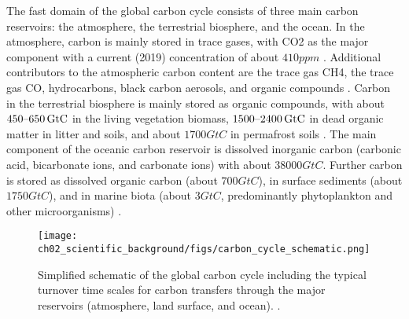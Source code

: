 The fast domain of the global carbon cycle consists of three main carbon
reservoirs: the atmosphere, the terrestrial biosphere, and the ocean. In the
atmosphere, carbon is mainly stored in trace gases, with \ac{CO2} as the major
component with a current (2019) concentration of about $410 \unit{ppm}$
\autocite{Friedlingstein2020}. Additional contributors to the atmospheric
carbon content are the trace gas \ac{CH4}, the trace gas \ac{CO}, hydrocarbons,
black carbon aerosols, and organic compounds \autocite{Ciais2013}. Carbon in
the terrestrial biosphere is mainly stored as organic compounds, with about
$\rangeunit{450}{650}{GtC}$ in the living vegetation biomass,
$\rangeunit{1500}{2400}{GtC}$ in dead organic matter in litter and soils, and
about $1700 \unit{GtC}$ in permafrost soils \autocite{Ciais2013}. The main
component of the oceanic carbon reservoir is dissolved inorganic carbon
(carbonic acid, bicarbonate ions, and carbonate ions) with about $38000
\unit{GtC}$. Further carbon is stored as dissolved organic carbon (about $700
\unit{GtC}$), in surface sediments (about $1750 \unit{GtC}$), and in marine
biota (about $3 \unit{GtC}$, predominantly phytoplankton and other
microorganisms) \autocite{Ciais2013, Friedlingstein2020}.

\begin{figure}[t]
  \centering
  \texttt{[image: 
    ch02\_scientific\_background/figs/carbon\_cycle\_schematic.png]}
  \caption[
    Simplified schematic of the global carbon cycle.
  ]{
    Simplified schematic of the global carbon cycle including the typical
    turnover time scales for carbon transfers through the major reservoirs
    (atmosphere, land surface, and ocean). .
  }
  \label{fig:02:carbon_cycle_schematic}
\end{figure}

